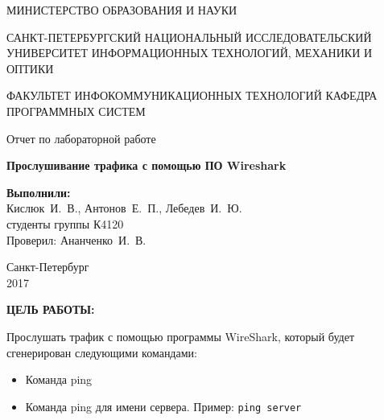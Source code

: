 \documentclass[14pt,a4paper]{extreport}
\newcommand{\header}[1]{%
{
\fontsize{16pt}{14pt}\selectfont
\begin{center}
\textbf{\MakeUppercase{#1}:}
\end{center}
}
}
\newcommand{\anan}{Ананченко~И.~В.}
\newcommand{\igork}{Кислюк~И.~В.}
\newcommand{\egor}{Антонов~Е.~П.}
\newcommand{\igorl}{Лебедев~И.~Ю.}
\begin{document}
	\begin{titlepage}
	\begin{center}	
		\fontsize{14pt}{14pt}\selectfont
		МИНИСТЕРСТВО ОБРАЗОВАНИЯ И НАУКИ\\

		\vspace*{0.6\baselineskip}
		
		САНКТ-ПЕТЕРБУРГСКИЙ НАЦИОНАЛЬНЫЙ ИССЛЕДОВАТЕЛЬСКИЙ УНИВЕРСИТЕТ ИНФОРМАЦИОННЫХ ТЕХНОЛОГИЙ, МЕХАНИКИ И ОПТИКИ
		
		\vspace*{0.6\baselineskip}
		ФАКУЛЬТЕТ ИНФОКОММУНИКАЦИОННЫХ ТЕХНОЛОГИЙ
		КАФЕДРА ПРОГРАММНЫХ СИСТЕМ
	
		\vspace*{7\baselineskip}
		\fontsize{19pt}{18pt}\selectfont
		Отчет по лабораторной работе
		
		\fontsize{20pt}{18pt}\selectfont
		\textbf{Прослушивание трафика с помощью ПО Wireshark}\\
		\vspace*{1.15\baselineskip}
		\end{center}
	
	\vspace*{2\baselineskip}
	\begin{flushright}
	\fontsize{14pt}{14pt}\selectfont
	\textbf{Выполнили:}\\
	\igork, \egor, \igorl\\
	студенты группы К4120\\
	Проверил: \anan\\
	\end{flushright}
	
	\vspace{\fill}
	\begin{center}
	Санкт-Петербург\\
	2017
	\end{center}
	
\end{titlepage}

\newpage

\header{Цель работы}

\fontsize{14pt}{14pt}\selectfont

Прослушать трафик с помощью программы WireShark, который будет сгенерирован следующими командами:

\begin{itemize}
\item Команда ping
\item Команда ping для имени сервера. Пример: \verb|ping server|
\end{itemize}
\end{document}
